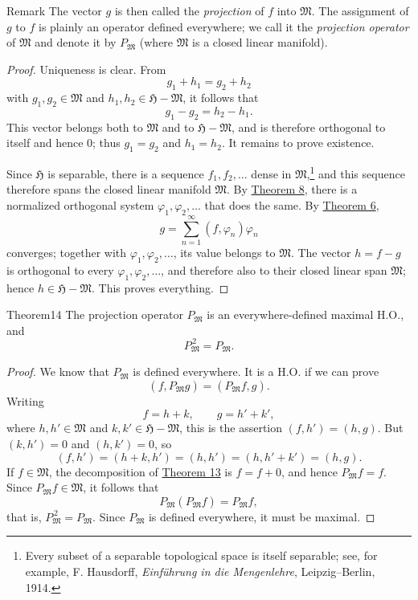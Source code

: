 ﻿\documentclass[paper=b5,fontsize=13pt,bookmarkpackage=false,twoside]{scrartcl}
\begin{document}
\begin{namedstatement}{Remark}{}\label{rem:13}
The vector $g$ is then called the \emph{projection} of $f$ into $\mathfrak M$. The assignment of $g$ to $f$ is plainly an operator defined everywhere; we call it the \emph{projection operator} of $\mathfrak M$ and denote it by $P_{\mathfrak M}$ (where $\mathfrak M$ is a closed linear manifold).
\end{namedstatement}

\begin{proof}
Uniqueness is clear. From
\[
g_1+h_1=g_2+h_2
\]
with $g_1,g_2\in\mathfrak M$ and $h_1,h_2\in\mathfrak H-\mathfrak M$, it follows that
\[
g_1-g_2=h_2-h_1.
\]
This vector belongs both to $\mathfrak M$ and to $\mathfrak H-\mathfrak M$, and is therefore orthogonal to itself and hence $0$; thus $g_1=g_2$ and $h_1=h_2$. It remains to prove existence.

Since $\mathfrak H$ is separable, there is a sequence $f_1,f_2,\ldots$ dense in $\mathfrak M$,\footnote{\label{fn:33}Every subset of a separable topological space is itself separable; see, for example, F. Hausdorff, \emph{Einführung in die Mengenlehre}, Leipzig--Berlin, 1914.} and this sequence therefore spans the closed linear manifold $\mathfrak M$. By \hyperref[thm:8]{Theorem 8}, there is a normalized orthogonal system $\varphi_1,\varphi_2,\ldots$ that does the same. By \hyperref[thm:6]{Theorem 6},
\[
g=\sum_{n=1}^{\infty}(f,\varphi_n)\varphi_n
\]
converges; together with $\varphi_1,\varphi_2,\ldots$, its value belongs to $\mathfrak M$. The vector $h=f-g$ is orthogonal to every $\varphi_1,\varphi_2,\ldots$, and therefore also to their closed linear span $\mathfrak M$; hence $h\in\mathfrak H-\mathfrak M$. This proves everything.
\end{proof}

\begin{namedstatement}{Theorem}{14}\label{thm:14}
The projection operator $P_{\mathfrak M}$ is an everywhere-defined maximal H.O., and
\[
P_{\mathfrak M}^{\,2}=P_{\mathfrak M}.
\]
\end{namedstatement}

\begin{proof}
We know that $P_{\mathfrak M}$ is defined everywhere. It is a H.O. if we can prove
\[
(f,P_{\mathfrak M}g)=(P_{\mathfrak M}f,g).
\]
Writing
\[
f=h+k,\qquad g=h'+k',
\]
where $h,h'\in\mathfrak M$ and $k,k'\in\mathfrak H-\mathfrak M$, this is the assertion $(f,h')=(h,g)$. But $(k,h')=0$ and $(h,k')=0$, so
\[
(f,h')=(h+k,h')=(h,h')=(h,h'+k')=(h,g).
\]
If $f\in\mathfrak M$, the decomposition of \hyperref[thm:13]{Theorem 13} is $f=f+0$, and hence $P_{\mathfrak M}f=f$. Since $P_{\mathfrak M}f\in\mathfrak M$, it follows that
\[
P_{\mathfrak M}(P_{\mathfrak M}f)=P_{\mathfrak M}f,
\]
that is, $P_{\mathfrak M}^{\,2}=P_{\mathfrak M}$. Since $P_{\mathfrak M}$ is defined everywhere, it must be maximal.
\end{proof}
\end{document}
